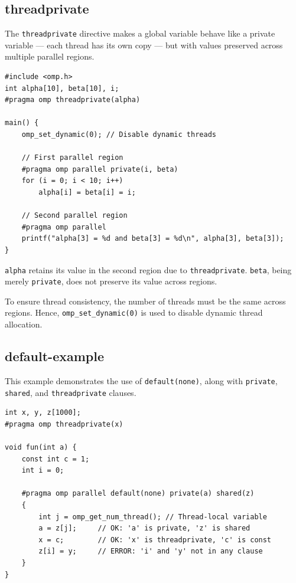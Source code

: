 \documentclass[12pt]{book}
\begin{document}
\subsection{threadprivate}

The \texttt{threadprivate} directive makes a global variable behave like a private variable — each thread has its own copy — but with values preserved across multiple parallel regions.

\begin{lstlisting}[style=cppstyle, caption={threadprivate Directive}, captionpos=b, label={lst:threadprivate}]
#include <omp.h>
int alpha[10], beta[10], i;
#pragma omp threadprivate(alpha)

main() {
    omp_set_dynamic(0); // Disable dynamic threads

    // First parallel region
    #pragma omp parallel private(i, beta)
    for (i = 0; i < 10; i++)
        alpha[i] = beta[i] = i;

    // Second parallel region
    #pragma omp parallel
    printf("alpha[3] = %d and beta[3] = %d\n", alpha[3], beta[3]);
}
\end{lstlisting}

\texttt{alpha} retains its value in the second region due to \texttt{threadprivate}. \texttt{beta}, being merely \texttt{private}, does not preserve its value across regions.

To ensure thread consistency, the number of threads must be the same across regions. Hence, \texttt{omp\_set\_dynamic(0)} is used to disable dynamic thread allocation.

\subsection{default-example}

This example demonstrates the use of \texttt{default(none)}, along with \texttt{private}, \texttt{shared}, and \texttt{threadprivate} clauses.

\begin{lstlisting}[style=cppstyle, caption={default-Example}, captionpos=b, label={lst:default}]
int x, y, z[1000];
#pragma omp threadprivate(x)

void fun(int a) {
    const int c = 1;
    int i = 0;

    #pragma omp parallel default(none) private(a) shared(z)
    {
        int j = omp_get_num_thread(); // Thread-local variable
        a = z[j];     // OK: 'a' is private, 'z' is shared
        x = c;        // OK: 'x' is threadprivate, 'c' is const
        z[i] = y;     // ERROR: 'i' and 'y' not in any clause
    }
}
\end{lstlisting}
\end{document}
